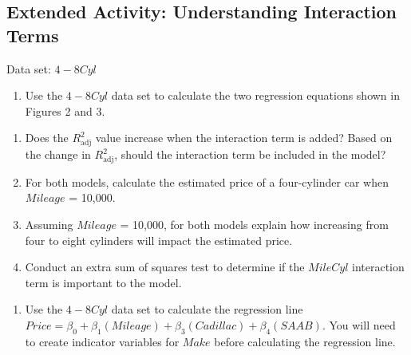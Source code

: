 \documentclass[
]{report}
\providecommand{\tightlist}{%
  \setlength{\itemsep}{0pt}\setlength{\parskip}{0pt}}
\theoremstyle{definition}
\theoremstyle{definition}
\theoremstyle{definition}
\theoremstyle{definition}
\theoremstyle{remark}
\begin{document}
\vspace*{2cm}

\hypertarget{extended-activity-understanding-interaction-terms}{%
\subsection*{Extended Activity: Understanding Interaction Terms}\label{extended-activity-understanding-interaction-terms}}

Data set: \(4-8Cyl\)

\begin{enumerate}
\def\labelenumi{\arabic{enumi}.}
\setcounter{enumi}{34}
\tightlist
\item
  Use the \(4-8Cyl\) data set to calculate the two regression equations shown in Figures 2 and 3.
\end{enumerate}

\begin{enumerate}
\def\labelenumi{\alph{enumi}.}
\tightlist
\item
  Does the \(R^2_{\text{adj}}\) value increase when the interaction term is added? Based on the change in \(R^2_{\text{adj}}\), should the interaction term be included in the model?
\item
  For both models, calculate the estimated price of a four-cylinder car when \(Mileage\) = 10,000.
\item
  Assuming \(Mileage\) = 10,000, for both models explain how increasing from four to eight cylinders will impact the estimated price.
\item
  Conduct an extra sum of squares test to determine if the \(MileCyl\) interaction term is important to the model.
\end{enumerate}

\begin{enumerate}
\def\labelenumi{\arabic{enumi}.}
\setcounter{enumi}{35}
\tightlist
\item
  Use the \(4-8Cyl\) data set to calculate the regression line \(Price = \beta_0 + \beta_1(Mileage) + \beta_3(Cadillac) + \beta_4(SAAB)\). You will need to create indicator variables for \(Make\) before calculating the regression line.
\end{enumerate}
\end{document}
